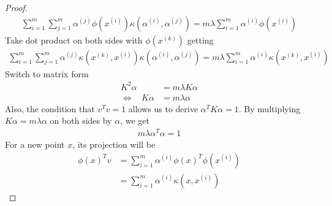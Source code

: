\documentclass[10pt,landscape]{article}
\begin{document}
\begin{multicols}{3}
\begin{proof}
\begin{align*}
		\sum_{i=1}^m \sum_{j=1}^m \alpha^{(j)} \phi(x^{(i)}) \kappa(\alpha^{(i)}, \alpha^{(j)}) = m \lambda \sum_{i=1}^m \alpha^{(i)} \phi(x^{(i)})
	\end{align*}
	Take dot product on both sides with $\phi(x^{(k)})$ getting
	\begin{align*}
		\sum_{i=1}^m \sum_{j=1}^m \alpha^{(j)} \kappa(x^{(k)}, x^{(i)}) \kappa(\alpha^{(i)}, \alpha^{(j)}) = m \lambda \sum_{i=1}^m \alpha^{(i)} \kappa(x^{(k)}, x^{(i)})
	\end{align*}
	Switch to matrix form
	\begin{align*}
		K^2 \alpha &= m \lambda K \alpha\\
		\Leftrightarrow \ \ \ \ K \alpha &= m \lambda \alpha
	\end{align*}
	Also, the condition that $v^Tv = 1$ allows us to derive $\alpha^T K \alpha = 1$. By multiplying $K \alpha = m \lambda \alpha$ on both sides by $\alpha$, we get
	\begin{align*}
		m \lambda \alpha^T \alpha = 1
	\end{align*}
	For a new point $x$, its projection will be
	\begin{align*}
		\phi(x)^T v &= \sum_{i=1}^m \alpha^{(i)} \phi(x)^T \phi(x^{(i)})\\
		&= \sum_{i=1}^m \alpha^{(i)} \kappa (x, x^{(i)})
	\end{align*}
\end{proof}


\end{multicols}
\end{document}
